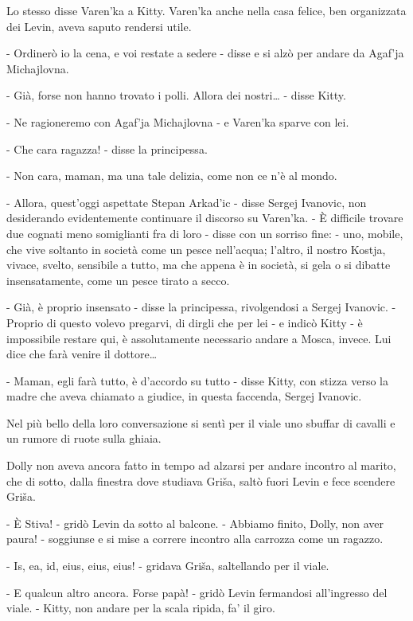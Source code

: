 Lo stesso disse Varen'ka a Kitty. Varen'ka anche nella casa felice, ben organizzata dei Levin, aveva saputo rendersi utile. 

- Ordinerò io la cena, e voi restate a sedere - disse e si alzò per andare da Agaf'ja Michajlovna. 

- Già, forse non hanno trovato i polli. Allora dei nostri\ldots{} - disse Kitty. 

- Ne ragioneremo con Agaf'ja Michajlovna - e Varen'ka sparve con lei. 

- Che cara ragazza! - disse la principessa. 

- Non cara, maman, ma una tale delizia, come non ce n'è al mondo. 

- Allora, quest'oggi aspettate Stepan Arkad'ic - disse Sergej Ivanovic, non desiderando evidentemente continuare il discorso su Varen'ka. - È difficile trovare due cognati meno somiglianti fra di loro - disse con un sorriso fine: - uno, mobile, che vive soltanto in società come un pesce nell'acqua; l'altro, il nostro Kostja, vivace, svelto, sensibile a tutto, ma che appena è in società, si gela o si dibatte insensatamente, come un pesce tirato a secco. 

- Già, è proprio insensato - disse la principessa, rivolgendosi a Sergej Ivanovic. - Proprio di questo volevo pregarvi, di dirgli che per lei - e indicò Kitty - è impossibile restare qui, è assolutamente necessario andare a Mosca, invece. Lui dice che farà venire il dottore\ldots{} 

- Maman, egli farà tutto, è d'accordo su tutto - disse Kitty, con stizza verso la madre che aveva chiamato a giudice, in questa faccenda, Sergej Ivanovic. 

Nel più bello della loro conversazione si sentì per il viale uno sbuffar di cavalli e un rumore di ruote sulla ghiaia. 

Dolly non aveva ancora fatto in tempo ad alzarsi per andare incontro al marito, che di sotto, dalla finestra dove studiava Griša, saltò fuori Levin e fece scendere Griša. 

- È Stiva! - gridò Levin da sotto al balcone. - Abbiamo finito, Dolly, non aver paura! - soggiunse e si mise a correre incontro alla carrozza come un ragazzo. 

- Is, ea, id, eius, eius, eius! - gridava Griša, saltellando per il viale. 

- E qualcun altro ancora. Forse papà! - gridò Levin fermandosi all'ingresso del viale. - Kitty, non andare per la scala ripida, fa' il giro. 

